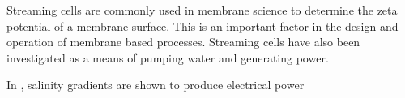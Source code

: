 \documentclass[10pt,final,journal]{IEEEtran}
\begin{document}
    Streaming cells are commonly used in membrane science to determine the zeta potential of a membrane surface.
    This is an important factor in the design and operation of membrane based processes. \cite{Daiguji2004b}
    Streaming cells have also been investigated as a means of pumping water and generating power.\cite{Daiguji2004b, Davidson2008, Hon2004, Olthuis2005}

    In \cite{CherngHon2012}, salinity gradients are shown to produce electrical power 

    
     

%
%
%
%
%
%
%
%
%
%
%
%
%
%
%
%
\end{document}
